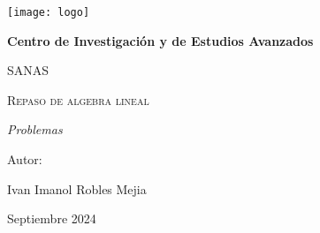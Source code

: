 \documentclass[12pt,titlepage]{article}
\begin{document}

\begin{titlepage}
    \centering
{\texttt{[image: logo]}\par}
\vspace{1cm}
{\bfseries\LARGE Centro de Investigación y de Estudios Avanzados \par}
\vspace{1cm}
{\scshape\Large SANAS \par}
\vspace{3cm}
{\scshape\Huge Repaso de algebra lineal \par}
\vspace{3cm}
{\itshape\Large Problemas \par}
\vfill
{\Large Autor: \par}
{\Large Ivan Imanol Robles Mejia \par}
\vfill
{\Large Septiembre 2024 \par}
\end{titlepage}
\clearpage
\end{document}
